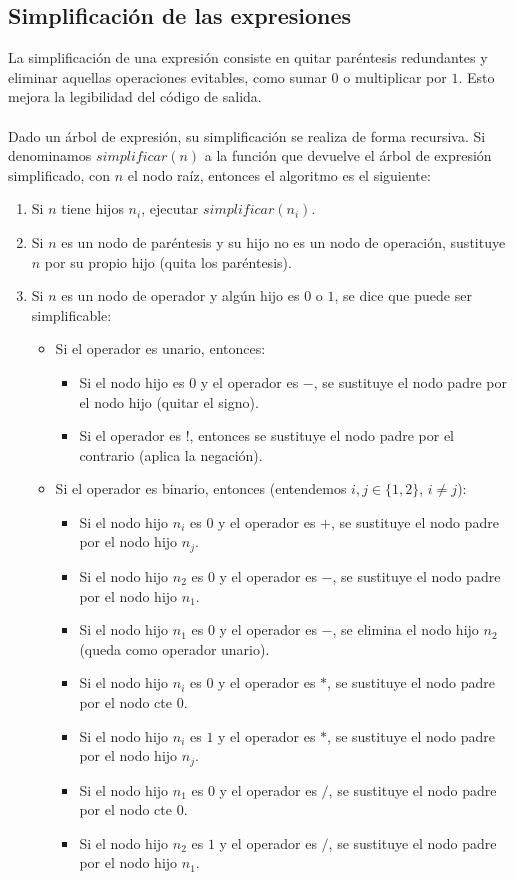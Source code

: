 \subsection*{Simplificación de las expresiones}
La simplificación de una expresión consiste en quitar paréntesis redundantes y eliminar aquellas operaciones evitables, como sumar $0$ o multiplicar por $1$. Esto mejora la legibilidad del código de salida.\\
\\Dado un árbol de expresión, su simplificación se realiza de forma recursiva. Si denominamos $simplificar(n)$ a la función que devuelve el árbol de expresión simplificado, con $n$ el nodo raíz, entonces el algoritmo es el siguiente:
\begin{enumerate}
	\item Si $n$ tiene hijos $n_i$, ejecutar $simplificar(n_i)$.
	\item Si $n$ es un nodo de paréntesis y su hijo no es un nodo de operación, sustituye $n$ por su propio hijo (quita los paréntesis).
	\item Si $n$ es un nodo de operador y algún hijo es $0$ o $1$, se dice que puede ser simplificable:
	\begin{itemize}
		\item Si el operador es unario, entonces:
		\begin{itemize}
			\item Si el nodo hijo es $0$ y el operador es $-$, se sustituye el nodo padre por el nodo hijo (quitar el signo).
			\item Si el operador es !, entonces se sustituye el nodo padre por el contrario (aplica la negación).
		\end{itemize}
		\item Si el operador es binario, entonces (entendemos $i,j \in \{1,2\}$, $i \neq j$):
		\begin{itemize}
			\item Si el nodo hijo $n_i$ es $0$ y el operador es $+$, se sustituye el nodo padre por el nodo hijo $n_j$.
			\item Si el nodo hijo $n_2$ es $0$ y el operador es $-$, se sustituye el nodo padre por el nodo hijo $n_1$.
			\item Si el nodo hijo $n_1$ es $0$ y el operador es $-$, se elimina el nodo hijo $n_2$ (queda como operador unario).
			\item Si el nodo hijo $n_i$ es $0$ y el operador es $*$, se sustituye el nodo padre por el nodo cte $0$.
			\item Si el nodo hijo $n_i$ es $1$ y el operador es $*$, se sustituye el nodo padre por el nodo hijo $n_j$.
			\item Si el nodo hijo $n_1$ es $0$ y el operador es $/$, se sustituye el nodo padre por el nodo cte $0$.
			\item Si el nodo hijo $n_2$ es $1$ y el operador es $/$, se sustituye el nodo padre por el nodo hijo $n_1$.
		\end{itemize}
	\end{itemize}
\end{enumerate}

